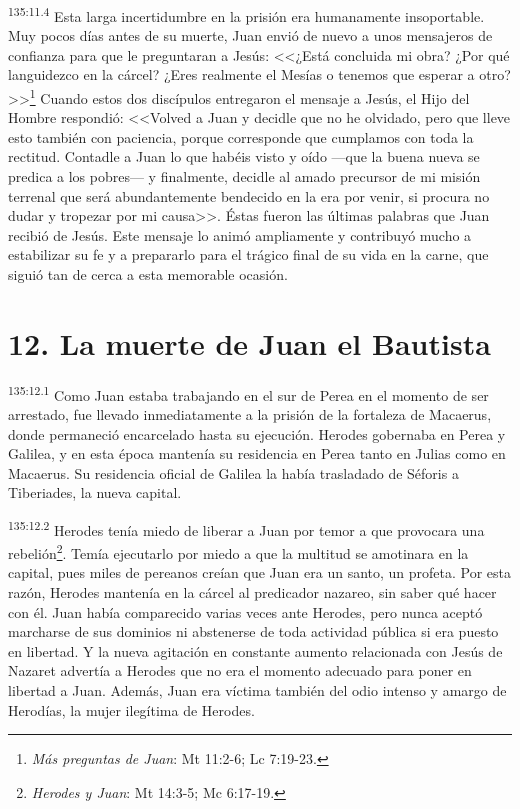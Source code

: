 \par 
\textsuperscript{135:11.4} Esta larga incertidumbre en la prisión era humanamente insoportable. Muy pocos días antes de su muerte, Juan envió de nuevo a unos mensajeros de confianza para que le preguntaran a Jesús: <<¿Está concluida mi obra? ¿Por qué languidezco en la cárcel? ¿Eres realmente el Mesías o tenemos que esperar a otro?>>\footnote{\textit{Más preguntas de Juan}: Mt 11:2-6; Lc 7:19-23.} Cuando estos dos discípulos entregaron el mensaje a Jesús, el Hijo del Hombre respondió: <<Volved a Juan y decidle que no he olvidado, pero que lleve esto también con paciencia, porque corresponde que cumplamos con toda la rectitud. Contadle a Juan lo que habéis visto y oído ---que la buena nueva se predica a los pobres--- y finalmente, decidle al amado precursor de mi misión terrenal que será abundantemente bendecido en la era por venir, si procura no dudar y tropezar por mi causa>>. Éstas fueron las últimas palabras que Juan recibió de Jesús. Este mensaje lo animó ampliamente y contribuyó mucho a estabilizar su fe y a prepararlo para el trágico final de su vida en la carne, que siguió tan de cerca a esta memorable ocasión.

\section*{12. La muerte de Juan el Bautista}
\par 
\textsuperscript{135:12.1} Como Juan estaba trabajando en el sur de Perea en el momento de ser arrestado, fue llevado inmediatamente a la prisión de la fortaleza de Macaerus, donde permaneció encarcelado hasta su ejecución. Herodes gobernaba en Perea y Galilea, y en esta época mantenía su residencia en Perea tanto en Julias como en Macaerus. Su residencia oficial de Galilea la había trasladado de Séforis a Tiberiades, la nueva capital.

\par 
\textsuperscript{135:12.2} Herodes tenía miedo de liberar a Juan por temor a que provocara una rebelión\footnote{\textit{Herodes y Juan}: Mt 14:3-5; Mc 6:17-19.}. Temía ejecutarlo por miedo a que la multitud se amotinara en la capital, pues miles de pereanos creían que Juan era un santo, un profeta. Por esta razón, Herodes mantenía en la cárcel al predicador nazareo, sin saber qué hacer con él. Juan había comparecido varias veces ante Herodes, pero nunca aceptó marcharse de sus dominios ni abstenerse de toda actividad pública si era puesto en libertad. Y la nueva agitación en constante aumento relacionada con Jesús de Nazaret advertía a Herodes que no era el momento adecuado para poner en libertad a Juan. Además, Juan era víctima también del odio intenso y amargo de Herodías, la mujer ilegítima de Herodes.

